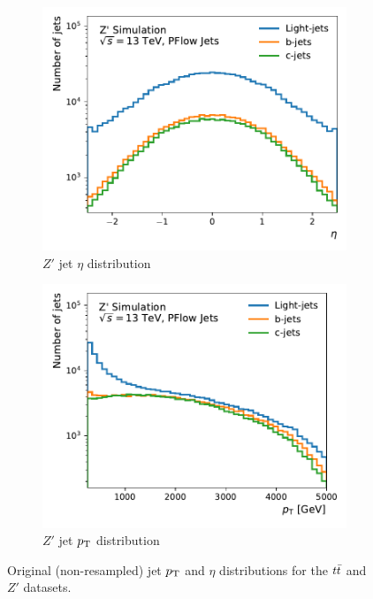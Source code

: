 \begin{figure}
\begin{subfigure}[b]{0.49\textwidth}
    \end{subfigure}
    \begin{subfigure}[b]{0.49\textwidth}
        \centering
        \includegraphics[width=\textwidth]{figures/flavour_tagging/zprime_0.pdf}
        \caption{$Z'$ jet $\eta$ distribution}
        \label{fig:zprime_eta}
    \end{subfigure}
    \begin{subfigure}[b]{0.49\textwidth}
        \centering
        \includegraphics[width=\textwidth]{figures/flavour_tagging/zprime_1.pdf}
        \caption{$Z'$ jet $p_{\text{T}}$ distribution}
        \label{fig:zprime_pt}
    \end{subfigure}
    \caption{Original (non-resampled) jet $p_{\text{T}}$ and $\eta$ distributions for the $t\bar{t}$ and $Z'$ datasets.}
    \label{fig:jet_pt_eta}
\end{figure}

